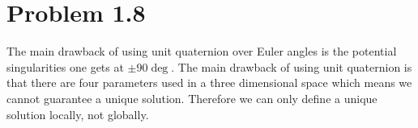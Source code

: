 \section*{Problem 1.8}


The main drawback of using unit quaternion over Euler angles is the potential singularities one gets at $\pm 90 \deg$.
The main drawback of using unit quaternion is that there are four parameters used in a three dimensional space which means we cannot guarantee a unique solution. Therefore we can only define a unique solution locally, not globally.